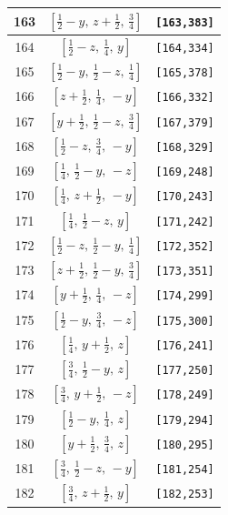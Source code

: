 \documentclass[fleqn,8pt]{jsarticle}
\begin{document}
\begin{longtable}{ccc}
163 & $\left[ \frac{1}{2} - y,\, z + \frac{1}{2},\, \frac{3}{4} \right]$ & {\tt [163,383]} \\ \hline
164 & $\left[ \frac{1}{2} - z,\, \frac{1}{4},\, y \right]$ & {\tt [164,334]} \\ \hline
165 & $\left[ \frac{1}{2} - y,\, \frac{1}{2} - z,\, \frac{1}{4} \right]$ & {\tt [165,378]} \\ \hline
166 & $\left[ z + \frac{1}{2},\, \frac{1}{4},\, - y \right]$ & {\tt [166,332]} \\ \hline
167 & $\left[ y + \frac{1}{2},\, \frac{1}{2} - z,\, \frac{3}{4} \right]$ & {\tt [167,379]} \\ \hline
168 & $\left[ \frac{1}{2} - z,\, \frac{3}{4},\, - y \right]$ & {\tt [168,329]} \\ \hline
169 & $\left[ \frac{1}{4},\, \frac{1}{2} - y,\, - z \right]$ & {\tt [169,248]} \\ \hline
170 & $\left[ \frac{1}{4},\, z + \frac{1}{2},\, - y \right]$ & {\tt [170,243]} \\ \hline
171 & $\left[ \frac{1}{4},\, \frac{1}{2} - z,\, y \right]$ & {\tt [171,242]} \\ \hline
172 & $\left[ \frac{1}{2} - z,\, \frac{1}{2} - y,\, \frac{1}{4} \right]$ & {\tt [172,352]} \\ \hline
173 & $\left[ z + \frac{1}{2},\, \frac{1}{2} - y,\, \frac{3}{4} \right]$ & {\tt [173,351]} \\ \hline
174 & $\left[ y + \frac{1}{2},\, \frac{1}{4},\, - z \right]$ & {\tt [174,299]} \\ \hline
175 & $\left[ \frac{1}{2} - y,\, \frac{3}{4},\, - z \right]$ & {\tt [175,300]} \\ \hline
176 & $\left[ \frac{1}{4},\, y + \frac{1}{2},\, z \right]$ & {\tt [176,241]} \\ \hline
177 & $\left[ \frac{3}{4},\, \frac{1}{2} - y,\, z \right]$ & {\tt [177,250]} \\ \hline
178 & $\left[ \frac{3}{4},\, y + \frac{1}{2},\, - z \right]$ & {\tt [178,249]} \\ \hline
179 & $\left[ \frac{1}{2} - y,\, \frac{1}{4},\, z \right]$ & {\tt [179,294]} \\ \hline
180 & $\left[ y + \frac{1}{2},\, \frac{3}{4},\, z \right]$ & {\tt [180,295]} \\ \hline
181 & $\left[ \frac{3}{4},\, \frac{1}{2} - z,\, - y \right]$ & {\tt [181,254]} \\ \hline
182 & $\left[ \frac{3}{4},\, z + \frac{1}{2},\, y \right]$ & {\tt [182,253]} \\ \hline

\end{longtable}
\end{document}
